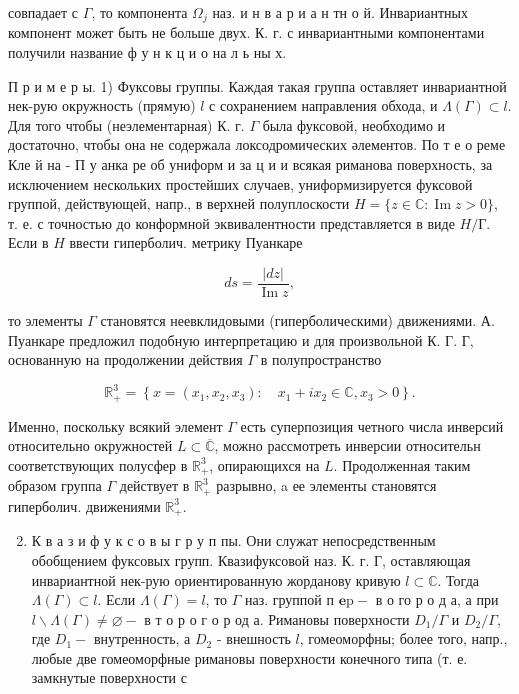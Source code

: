 \documentclass[10pt]{article}
\begin{document}
совпадает с $\Gamma$, то компонента $\Omega_{j}$ наз. и н в а р и а н тн о й. Инвариантных компонент может быть не больше двух. К. г. с инвариантными компонентами получили название ф у н к ц и о на л ь ны х.



П р и м е р ы. 1) Фуксовы группы. Каждая такая группа оставляет инвариантной нек-рую окружность (прямую) $l$ с сохранением направления обхода, и $\Lambda(\Gamma) \subset l$. Для того чтобы (неэлементарная) К. г. $\Gamma$ была фуксовой, необходимо и достаточно, чтобы она не содержала локсодромических әлементов. По т е о реме Кле й на - П у анка ре об униформ и за ц и и всякая риманова поверхность, за исключением нескольких простейших случаев, униформизируется фуксовой группой, действующей, напр., в верхней полуплоскости $H=\{z \in \mathbb{C}: \operatorname{Im} z>0\}$, т. е. с точностью до конформной эквивалентности представляется в виде $H / Г$. Если в $H$ ввести гиперболич. метрику Пуанкаре



\[

d s=\frac{|d z|}{\operatorname{Im} z},

\]



то элементы $\Gamma$ становятся неевклидовыми (гиперболическими) движениями. А. Пуанкаре предложил подобную интерпретацию и для произвольной К. Г. Г, основанную на продолжении действия $\Gamma$ в полупространство



\[

\mathbb{R}_{+}^{3}=\left\{x=\left(x_{1}, x_{2}, x_{3}\right): \quad x_{1}+i x_{2} \in \mathbb{C}, x_{3}>0\right\} .

\]



Именно, поскольку всякий элемент $\Gamma$ есть суперпозиция четного числа инверсий относительно окружностей $L \subset \overline{\mathbb{C}}$, можно рассмотреть инверсии относительн соответствующих полусфер в $\mathbb{R}_{+}^{3}$, опирающихся на $L$. Продолженная таким образом группа $\Gamma$ действует в $\mathbb{R}_{+}^{3}$ разрывно, a ее элементы становятся гиперболич. движениями $\mathbb{R}_{+}^{3}$.



\begin{enumerate}

  \setcounter{enumi}{1}

  \item К в а з и ф у к с о в ы г р у п пы. Они служат непосредственным обобщением фуксовых групп. Квазифуксовой наз. К. г. Г, оставляющая инвариантной нек-рую ориентированную жорданову кривую $l \subset \mathbb{C}$. Тогда $\Lambda(\Gamma) \subset l$. Если $\Lambda(\Gamma)=l$, то $\Gamma$ наз. группой п $\mathbf{e} \mathrm{p}-$ в о го р о д а, а при $l \backslash \Lambda(\Gamma) \neq \varnothing-$ в т о р о г о р од а. Римановы поверхности $D_{1} / \Gamma$ и $D_{2} / \Gamma$, где $D_{1}-$ внутренность, а $D_{2}$ - внешность $l$, гомеоморфны; более того, напр., любые две гомеоморфные римановы поверхности конечного типа (т. е. замкнутые поверхности с

\end{enumerate}
\end{document}

